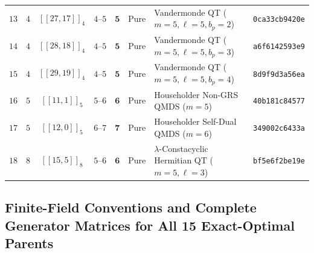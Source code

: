 \documentclass[11pt,a4paper]{article}
\theoremstyle{remark}
\begin{document}
\begin{table}[htbp]
{\begin{tabular}{@{}ccccccll@{}}
$13$ & $4$ & $[[27,17]]_{4}$ & $4\text{--}5$ & $\mathbf{5}$ & Pure & Vandermonde QT ($m=5, \ell=5, b_p=2$) & \texttt{0ca33cb9420e} \\
$14$ & $4$ & $[[28,18]]_{4}$ & $4\text{--}5$ & $\mathbf{5}$ & Pure & Vandermonde QT ($m=5, \ell=5, b_p=3$) & \texttt{a6f6142593e9} \\
$15$ & $4$ & $[[29,19]]_{4}$ & $4\text{--}5$ & $\mathbf{5}$ & Pure & Vandermonde QT ($m=5, \ell=5, b_p=4$) & \texttt{8d9f9d3a56ea} \\
\midrule
$16$ & $5$ & $[[11,1]]_{5}$ & $5\text{--}6$ & $\mathbf{6}$ & Pure & Householder Non-GRS QMDS ($m=5$) & \texttt{40b181c84577} \\
$17$ & $5$ & $[[12,0]]_{5}$ & $6\text{--}7$ & $\mathbf{7}$ & Pure & Householder Self-Dual QMDS ($m=6$) & \texttt{349002c6433a} \\
\midrule
$18$ & $8$ & $[[15,5]]_{8}$ & $5\text{--}6$ & $\mathbf{6}$ & Pure & $\lambda$-Constacyclic Hermitian QT ($m=5, \ell=3$) & \texttt{bf5e6f2be19e} \\
\bottomrule
\end{tabular}}
\end{table}

\subsection{Finite-Field Conventions and Complete Generator Matrices for All 15 Exact-Optimal Parents}\label{subsec:matrices}
\end{document}
